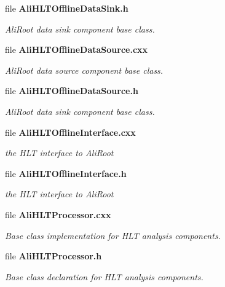 \begin{CompactItemize}
\item 
file {\bf Ali\-HLTOffline\-Data\-Sink.h}
\begin{CompactList}\small\item\em Ali\-Root data sink component base class. \item\end{CompactList}

\item 
file {\bf Ali\-HLTOffline\-Data\-Source.cxx}
\begin{CompactList}\small\item\em Ali\-Root data source component base class. \item\end{CompactList}

\item 
file {\bf Ali\-HLTOffline\-Data\-Source.h}
\begin{CompactList}\small\item\em Ali\-Root data sink component base class. \item\end{CompactList}

\item 
file {\bf Ali\-HLTOffline\-Interface.cxx}
\begin{CompactList}\small\item\em the HLT interface to Ali\-Root \item\end{CompactList}

\item 
file {\bf Ali\-HLTOffline\-Interface.h}
\begin{CompactList}\small\item\em the HLT interface to Ali\-Root \item\end{CompactList}

\item 
file {\bf Ali\-HLTProcessor.cxx}
\begin{CompactList}\small\item\em Base class implementation for HLT analysis components. \item\end{CompactList}

\item 
file {\bf Ali\-HLTProcessor.h}
\begin{CompactList}\small\item\em Base class declaration for HLT analysis components. \item\end{CompactList}


\end{CompactItemize}
